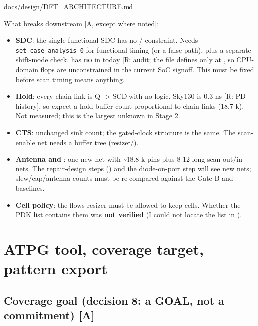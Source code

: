 \begin{relocated}{docs/design/DFT_ARCHITECTURE.md}
{}

What breaks downstream {[}A, except where noted{]}:

\begin{itemize}
\tightlist
\item
  \textbf{SDC}: the single functional SDC has no
  / constraint. Needs
  \texttt{set\_\allowbreak{}case\_\allowbreak{}analysis\ 0} for
  functional timing (or a false path), plus a separate shift-mode check.
   has \textbf{no } in
   today {[}R: audit; the file defines only
   at \code{:237}{]}, so CPU-domain flops are
  unconstrained in the current SoC signoff. This must be fixed before
  scan timing means anything.
\item
  \textbf{Hold}: every chain link is Q -\textgreater{} SCD with no
  logic. Sky130  is 0.3 ns {[}R: PD
  history{]}, so expect a hold-buffer count proportional to chain links
  (18.7 k). Not measured; this is the largest unknown in Stage 2.
\item
  \textbf{CTS}: unchanged sink count; the gated-clock structure is the
  same. The scan-enable net needs a buffer tree
  (resizer/).
\item
  \textbf{Antenna and }: one new net with \textasciitilde18.8
  k pins plus 8-12 long scan-out/\allowbreak{}in nets. The repair-design
  steps () and the diode-on-port step will
  see new nets; slew/\allowbreak{}cap/\allowbreak{}antenna counts must
  be re-compared against the Gate B and  baselines.
\item
  \textbf{Cell policy}: the flow\textquotesingle s resizer must be
  allowed to keep  cells. Whether the PDK
   list contains them was \textbf{not verified} (I
  could not locate the list in ).
\end{itemize}

\section{ATPG tool, coverage target, pattern export}\label{tm:ch:dft-architecture:2-atpg-tool-coverage-target-pattern-export}

\subsection{Coverage goal (decision 8: a GOAL, not a commitment)
{[}A{]}}\label{tm:ch:dft-architecture:21-coverage-goal-decision-8-a-goal-not-a-commitment-a}


\end{relocated}
